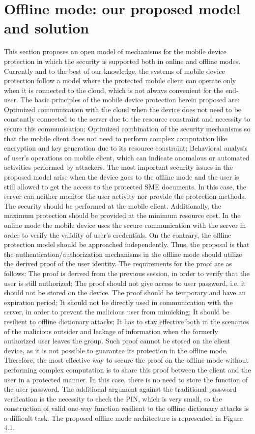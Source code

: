 \documentclass[twocolumn]{svjour3}          %
\begin{document}
\section{Offline mode: our proposed model and solution}
\label{sec_offline_mode}
This section proposes an open model of mechanisms for the mobile device protection in which the security is supported both in online and offline modes. Currently and to the best of our knowledge, the systems of mobile device protection follow a model where the protected mobile client can operate only when it is connected to the cloud, which is not always convenient for the end-user. The basic principles of the mobile device protection herein proposed are: 
Optimized communication with the cloud when the device does not need to be constantly connected to the server due to the resource constraint and necessity to secure this communication;
Optimized combination of the security mechanisms so that the mobile client does not need to perform complex computation like encryption and key generation due to its resource constraint;
Behavioral analysis of user's operations on mobile client, which can indicate anomalous or automated activities performed by attackers.
The most important security issues in the proposed model arise when the device goes to the offline mode and the user is still allowed to get the access to the protected SME documents. In this case, the server can neither monitor the user activity nor provide the protection methods. The security should be performed at the mobile client. Additionally, the maximum protection should be provided at the minimum resource cost. 
In the online mode the mobile device uses the secure communication with the server in order to verify the validity of user’s credentials. On the contrary, the offline protection model should be approached independently. Thus, the proposal is that the authentication/authorization mechanisms in the offline mode should utilize the derived proof of the user identity. The requirements for the proof are as follows:
The proof is derived from the previous session, in order to verify that the user is still authorized;
The proof should not give access to user password, i.e. it should not be stored on the device.
The proof should be temporary and have an expiration period;
It should not be directly used in communication with the server, in order to prevent the malicious user from mimicking;
It should be resilient to offline dictionary attacks;
It has to stay effective both in the scenarios of the malicious outsider and leakage of information when the formerly authorized user leaves the group.
Such proof cannot be stored on the client device, as it is not possible to guarantee its protection in the offline mode. Therefore, the most effective way to secure the proof on the offline mode without performing complex computation is to share this proof between the client and the user in a protected manner. In this case, there is no need to store the function of the user password. The additional argument against the traditional password verification is the necessity to check the PIN, which is very small, so the construction of valid one-way function resilient to the offline dictionary attacks is a difficult task.
The proposed offline mode architecture is represented in Figure 4.1.
\end{document}
